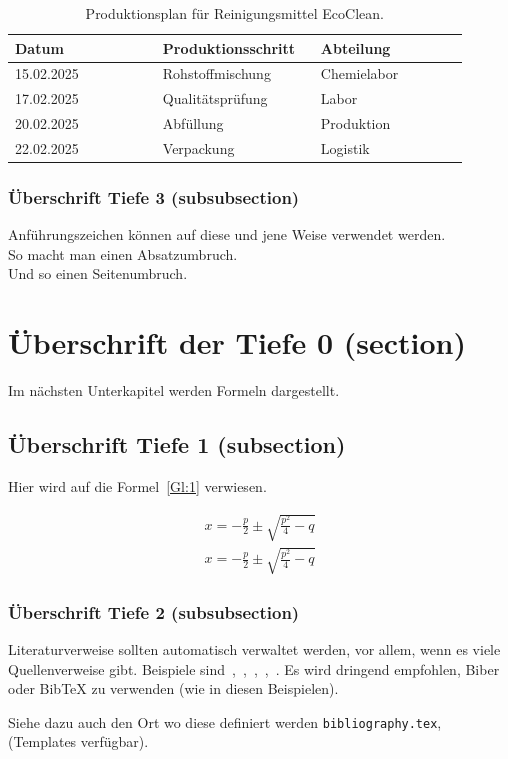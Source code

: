         \begin{table}[!htbp]
            \centering
            \begin{tabular}{| p{0.3\linewidth} | p{0.3\linewidth} | p{0.3\linewidth} |}\hline
            Datum & Produktionsschritt & Abteilung\\\hline
            15.02.2025 & Rohstoffmischung & Chemielabor\\
            17.02.2025 & Qualitätsprüfung & Labor\\
            20.02.2025 & Abfüllung & Produktion\\
            22.02.2025 & Verpackung & Logistik\\\hline
            \end{tabular}
            \caption{Produktionsplan für Reinigungsmittel \glqq{} EcoClean\grqq{}.}\label{tab:1}
        \end{table}



        
        \subsubsection{Überschrift Tiefe 3 (subsubsection)}
        Anführungszeichen können auf \glq{}diese\grq{} und \glqq{}jene\grqq{} Weise verwendet werden.\\

        So macht man einen Absatzumbruch.\\
        Und so einen Seitenumbruch.\clearpage


\section{Überschrift der Tiefe 0 (section)}
Im nächsten Unterkapitel werden Formeln dargestellt.


    \subsection{Überschrift Tiefe 1 (subsection)}
    Hier wird auf die Formel~\ref{Gl:1} verwiesen.

    \begin{align}
        x = -\frac{p}{2}\pm\sqrt{\frac{p^2}{4}-q}\label{Gl:1}
    \end{align}
    \begin{align}
        x = -\frac{p}{2}\pm\sqrt{\frac{p^2}{4}-q}\label{Gl:2}
    \end{align}

        \subsubsection{Überschrift Tiefe 2 (subsubsection)}
        Literaturverweise sollten automatisch verwaltet werden, vor allem, wenn es viele Quellenverweise gibt. 
        Beispiele sind~\cite{Ko05a},~\cite{Ko05b},~\cite{MiGo05},~\cite{TeGo14},~\cite{HuHa07}.
        Es wird dringend empfohlen, Biber oder BibTeX zu verwenden (wie in diesen Beispielen).
        
        Siehe dazu auch den Ort wo diese definiert werden \verb|bibliography.tex|, (Templates verfügbar).

    

\clearpage